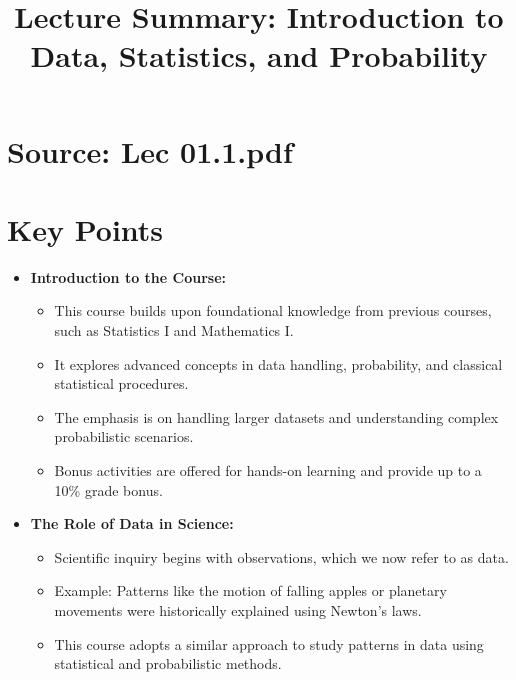 \documentclass{article}
\title{Lecture Summary: Introduction to Data, Statistics, and Probability}
\author{}
\date{}
\begin{document}
\maketitle

\section*{Source: Lec 01.1.pdf}

\section*{Key Points}

\begin{itemize}
  \item \textbf{Introduction to the Course:}
    \begin{itemize}
      \item This course builds upon foundational knowledge from previous courses, such as Statistics I and Mathematics I.
      \item It explores advanced concepts in data handling, probability, and classical statistical procedures.
      \item The emphasis is on handling larger datasets and understanding complex probabilistic scenarios.
      \item Bonus activities are offered for hands-on learning and provide up to a 10\% grade bonus.
    \end{itemize}

  \item \textbf{The Role of Data in Science:}
    \begin{itemize}
      \item Scientific inquiry begins with observations, which we now refer to as data.
      \item Example: Patterns like the motion of falling apples or planetary movements were historically explained using Newton’s laws.
      \item This course adopts a similar approach to study patterns in data using statistical and probabilistic methods.
    \end{itemize}


\end{itemize}
\end{document}
